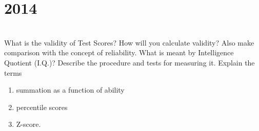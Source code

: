 \section*{2014}
\vspace{-.5cm}
\hrulefill \smallskip\\
 What is the validity of Test Scores? How will you calculate validity? Also make comparison with the concept of reliability.
\myline
{} What is meant by Intelligence Quotient (I.Q.)? Describe the procedure and tests for measuring it.
\myline
{} Explain the terms 
\begin{enumerate}[itemsep = 0ex,label=(\roman*)]
\item summation as a function of ability
\item percentile scores
\item Z-score.
\end{enumerate}
